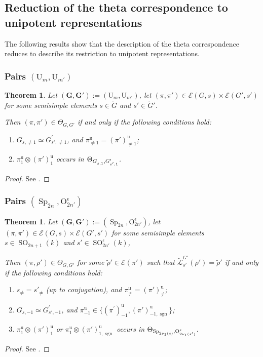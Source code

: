\documentclass[12pt]{amsart}
\numberwithin{equation}{subsection}
\newtheorem{thm}[equation]{Theorem}
\newcommand{\cE}{\mathcal{E}}
\newcommand{\cL}{\mathcal{L}}
\newcommand{\tcL}{{\widetilde{\cL}}}
\newcommand{\sgn}{\operatorname{sgn}}
\newcommand{\rU}{\mathrm{U}}
\newcommand{\bG}{\mathbf{G}}
\newcommand{\unip}{\mathrm{u}}
\newcommand{\Sp}{\operatorname{Sp}}
\newcommand{\SO}{\operatorname{SO}}
\def\rO{{\mathrm{O}}}
\renewcommand{\tilde}{\widetilde}
\begin{document}
\subsection{Reduction of the theta correspondence to unipotent representations} \label{sec:reduc}

The following results show that the description of the theta correspondence reduces to describe its restriction to unipotent representations.

\subsubsection{Pairs $(\rU_{m},\rU_{m'})$}
\begin{thm} \label{thm:reducUU}
Let $(\bG,\bG'):=(\rU_{m},\rU_{m'})$, let $(\pi,\pi')\in\cE(G,s)\times\cE(G',s')$ for some semisimple elements $s\in \check G$ and $s'\in \check G'$.

Then  $(\pi,\pi')\in\Theta_{G,G'}$  if and only if the following conditions hold:
\begin{enumerate}
\item $G_{s,\ne 1}\simeq G^{\prime}_{s',\ne 1}$, and $\pi^\unip_{\neq 1}=(\pi')^\unip_{\neq 1}$;
\item $\pi^\unip_1\otimes(\pi')^\unip_1$ occurs in $\Theta_{G_{\vphantom{s'}s,1},G'_{s',1}}$.
\end{enumerate}
\end{thm}
\begin{proof}
See \cite[Th\'eor\`eme~2.6]{AMR}.
\end{proof}

\subsubsection{Pairs $(\Sp_{2n},\rO_{2n'}^\epsilon)$}
\begin{thm}  \label{thm:reducSpOeven}
Let $(\bG,\bG'):=(\Sp_{2n},\rO_{2n'}^\epsilon)$, let $(\pi,\pi')\in\cE(G,s)\times\cE(G',s')$ for some semisimple elements $s\in \SO_{2n+1}(k)$ and $s'\in \SO_{2n'}^\epsilon(k)$,

Then  $(\pi,\rho')\in\Theta_{G,G'}$ for some $\tilde\rho'\in \cE(\pi')$ such that $\tcL_{s'}^{G'}(\rho')=\tilde\rho'$ if and only if the following conditions hold:
\begin{enumerate}
\item $s_{\neq}=s'_{\neq}$ (up to conjugation), and $\pi^\unip_{\neq}=(\pi')^\unip_{\neq}$;
\item $G_{s,-1}\simeq G^{\prime}_{s',-1}$, and $\pi^\unip_{-1}\in\{(\pi^{\prime})^{\unip}_{-1},(\pi')^{\unip}_{-1,\sgn}\}$;
\item $\pi^\unip_1\otimes(\pi')^\unip_1$ or $\pi^\unip_1\otimes(\pi')^\unip_{1,\sgn}$ occurs in $\Theta_{\Sp_{\vphantom{s'}2\nu_1(s)},\rO^\epsilon_{2\nu_1(s')}}$.
\end{enumerate}
\end{thm}
\begin{proof}
See \cite[Theorem~5.10]{Pan-MathAnn}.
\end{proof}
\end{document}

